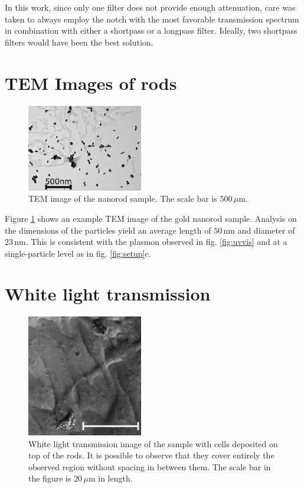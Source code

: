 \documentclass[journal=nalefd,manuscript=letter]{achemso}
\newcommand{\nm}{\ensuremath{\,\textrm{nm}}}
\newcommand{\um}{\ensuremath{\,\mu\textrm{m}}}
\begin{document}
In this work, since only one filter does not provide enough attenuation, care was
taken to always employ the notch with the most favorable transmission spectrum
in combination with either a shortpass or a longpass filter. Ideally, two
shortpass filters would have been the best solution.
 
 \section{TEM Images of rods}
 
\begin{figure}[htp]
 \centering
 \includegraphics[width=0.45\textwidth]{Figures/Supplementary/04_TEM/tem.png}
 \caption{TEM image of the nanorod sample. The scale bar is $500\um$. }
 \label{fig:TEM}
 \end{figure}
 
Figure \ref{fig:TEM} shows an example TEM image of the gold nanorod sample.
Analysis on the dimensions of the particles yield an average length of $50\nm$
and diameter of $23\nm$. This is consistent with the plasmon observed in fig.
\ref{fig:uvvis} and at a single-particle level as in fig. \ref{fig:setup}c.

\section{White light transmission}
\begin{figure}[htp]
\centering
	\includegraphics[width=0.45\textwidth]{Figures/Supplementary/05_White_Light/white_light_scale.png}
	\caption{White light transmission image of the sample with cells deposited on
	top of the rods. It is possible to observe that they cover entirely the
	observed region without spacing in between them. The scale bar in the figure
	is $20\um$ in length.}
	\label{fig:white-light}
\end{figure}
\end{document}
